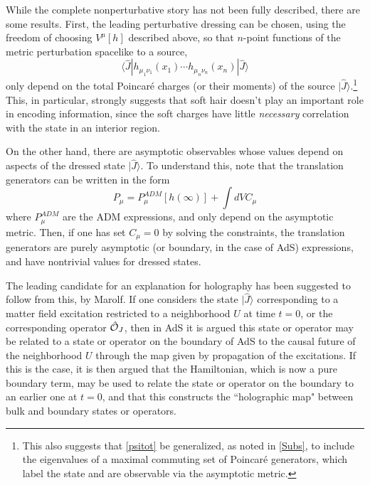 \documentclass[12pt]{article}
\numberwithin{equation}{section}
\newcommand{\calo}{{\cal O}}
\newcommand{\beq}{\begin{equation}}
\newcommand{\eeq}{\end{equation}}
\begin{document}
While the complete nonperturbative story has not been fully described, there are some results.  First, the leading perturbative dressing can be chosen, using the freedom of choosing $V^\mu[h]$ described above, so that $n$-point functions of the metric perturbation spacelike to a source,
\beq
\langle\widehat J|h_{\mu_1\nu_1}(x_1)\cdots h_{\mu_n\nu_n}(x_n)|\widehat J\rangle
\eeq
only depend on the total Poincar\'e charges (or their moments)\cite{SGsplit} of the source $|\hat J\rangle$.\footnote{This also suggests that \eqref{psitot} be generalized, as noted in \ref{Subs}, to include the eigenvalues of a maximal commuting set of Poincar\'e generators, which label the state and are observable via the asymptotic metric.}  This, in particular, strongly suggests\cite{DoGi3,DoGi4,SGsplit} that soft hair\cite{Hawk-Info,HPS1,HPS2,astrosrev,astrorevisit,HHPS} doesn't play an important role in encoding information, since the soft charges have little {\it necessary} correlation with the state in an interior region.

On the other hand, there are asymptotic observables whose values depend on aspects of the dressed state $|\hat J\rangle$.  To understand this, note that the translation generators can be written in the form
\beq
P_\mu= P_\mu^{ADM}[h(\infty)] + \int dV C_\mu
\eeq
where $P_\mu^{ADM}$ are the ADM expressions, and only depend on the asymptotic metric.  Then, if one has set $C_\mu=0$ by solving the constraints, the translation generators are purely asymptotic (or boundary, in the case of AdS) expressions, and have nontrivial values for dressed states. 

The leading candidate for an explanation for holography has been suggested to follow from this, by Marolf\cite{MaroUH,Marothought, MaroholoNS}.  If one considers the state $|\hat J\rangle$ corresponding to a matter field excitation restricted to a neighborhood $U$ at time $t=0$, or the corresponding operator $\hat\calo_J$, then in AdS it is argued this state or operator may be related to a state or operator on the boundary of AdS to the causal future of the neighborhood $U$ through the map given by propagation of the excitations.  If this is the case, it is then argued that the Hamiltonian, which is now a pure boundary term, may be used to relate the state or operator on the boundary to an earlier one at $t=0$, and that this constructs the ``holographic map" between bulk and boundary states or operators.
\end{document}
